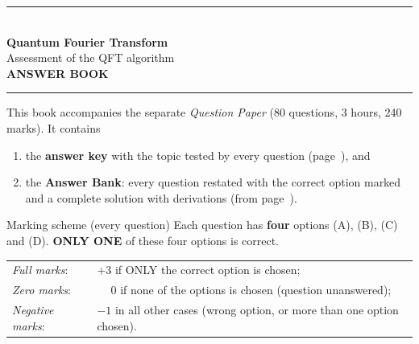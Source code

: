 \documentclass[11pt,a4paper]{article}
\begin{document}
\pagestyle{fancy}\fancyhf{}
\renewcommand{\headrulewidth}{0.4pt}

\thispagestyle{empty}
\begin{center}
{\color{brand}\rule{\linewidth}{1.2pt}}\\[6pt]
{\Huge\bfseries\color{brand} Quantum Fourier Transform}\\[4pt]
{\Large Assessment of the QFT algorithm}\\[4pt]
{\large\bfseries ANSWER BOOK}\\[2pt]
{\color{brand}\rule{\linewidth}{1.2pt}}
\end{center}
This book accompanies the separate \emph{Question Paper} (80 questions, 3 hours, 240 marks). It contains
\begin{enumerate}[leftmargin=1.4em, itemsep=0pt, topsep=2pt]
\item the \textbf{answer key} with the topic tested by every question (page~\pageref{key}), and
\item the \textbf{Answer Bank}: every question restated with the correct option marked \textcolor{okgreen}{} and a
      complete solution with derivations (from page~\pageref{bank}).
\end{enumerate}
\begin{infobox}{Marking scheme (every question)}
Each question has \textbf{four} options (A), (B), (C) and (D). \textbf{ONLY ONE} of these four options is correct.\\[2pt]
\begin{tabular}{@{}ll@{}}
\emph{Full marks}: & $+3$ if ONLY the correct option is chosen;\\
\emph{Zero marks}: & $\phantom{+}0$ if none of the options is chosen (question unanswered);\\
\emph{Negative marks}: & $-1$ in all other cases (wrong option, or more than one option chosen).
\end{tabular}
\end{infobox}
\end{document}
